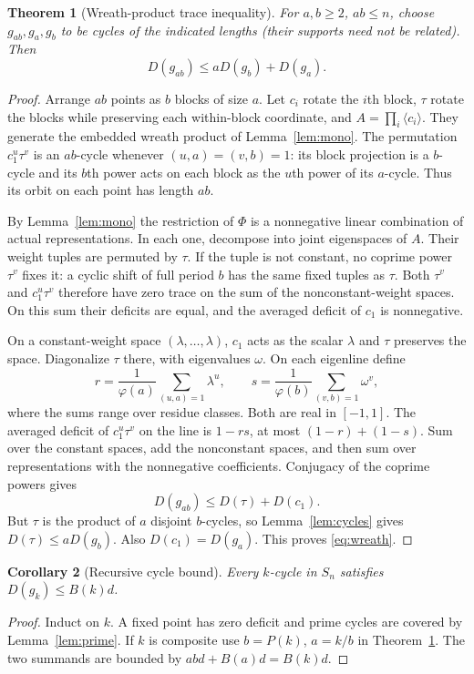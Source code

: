\documentclass[11pt]{article}
\newtheorem{theorem}{Theorem}[section]
\newtheorem{corollary}[theorem]{Corollary}
\theoremstyle{remark}
\begin{document}
\begin{theorem}[Wreath-product trace inequality]\label{thm:wreath}
For $a,b\ge2$, $ab\le n$, choose $g_{ab},g_a,g_b$ to be cycles of the indicated lengths (their supports need not be related). Then
\begin{equation}\label{eq:wreath}
 D(g_{ab})\le a D(g_b)+D(g_a).
\end{equation}
\end{theorem}
\begin{proof}
Arrange $ab$ points as $b$ blocks of size $a$. Let $c_i$ rotate the $i$th block, $\tau$ rotate the blocks while preserving each within-block coordinate, and $A=\prod_i\langle c_i\rangle$. They generate the embedded wreath product of Lemma~\ref{lem:mono}. The permutation $c_1^u\tau^v$ is an $ab$-cycle whenever $(u,a)=(v,b)=1$: its block projection is a $b$-cycle and its $b$th power acts on each block as the $u$th power of its $a$-cycle. Thus its orbit on each point has length $ab$.

By Lemma~\ref{lem:mono} the restriction of $\Phi$ is a nonnegative linear combination of actual representations. In each one, decompose into joint eigenspaces of $A$. Their weight tuples are permuted by $\tau$. If the tuple is not constant, no coprime power $\tau^v$ fixes it: a cyclic shift of full period $b$ has the same fixed tuples as $\tau$. Both $\tau^v$ and $c_1^u\tau^v$ therefore have zero trace on the sum of the nonconstant-weight spaces. On this sum their deficits are equal, and the averaged deficit of $c_1$ is nonnegative.

On a constant-weight space $(\lambda,\ldots,\lambda)$, $c_1$ acts as the scalar $\lambda$ and $\tau$ preserves the space. Diagonalize $\tau$ there, with eigenvalues $\omega$. On each eigenline define
\[
 r=\frac1{\varphi(a)}\sum_{(u,a)=1}\lambda^u,\qquad
 s=\frac1{\varphi(b)}\sum_{(v,b)=1}\omega^v,
\]
where the sums range over residue classes. Both are real in $[-1,1]$. The averaged deficit of $c_1^u\tau^v$ on the line is $1-rs$, at most $(1-r)+(1-s)$. Sum over the constant spaces, add the nonconstant spaces, and then sum over representations with the nonnegative coefficients. Conjugacy of the coprime powers gives
\[
 D(g_{ab})\le D(\tau)+D(c_1).
\]
But $\tau$ is the product of $a$ disjoint $b$-cycles, so Lemma~\ref{lem:cycles} gives $D(\tau)\le aD(g_b)$. Also $D(c_1)=D(g_a)$. This proves \eqref{eq:wreath}.
\end{proof}

\begin{corollary}[Recursive cycle bound]\label{cor:rec}
Every $k$-cycle in $S_n$ satisfies $D(g_k)\le B(k)d$.
\end{corollary}
\begin{proof}
Induct on $k$. A fixed point has zero deficit and prime cycles are covered by Lemma~\ref{lem:prime}. If $k$ is composite use $b=P(k)$, $a=k/b$ in Theorem~\ref{thm:wreath}. The two summands are bounded by $ab d+B(a)d=B(k)d$.
\end{proof}
\end{document}
